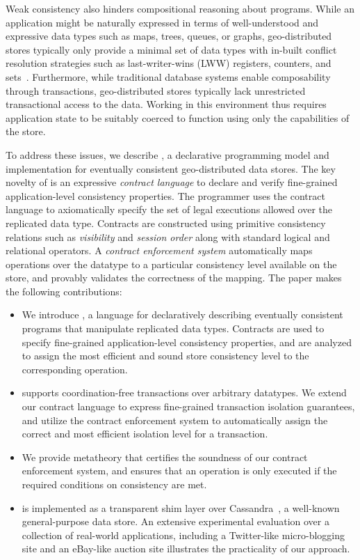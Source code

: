 Weak consistency also hinders compositional reasoning about programs.  While
an application might be naturally expressed in terms of well-understood and
expressive data types such as maps, trees, queues, or graphs,
geo-distributed stores typically only provide a minimal set of data types
with in-built conflict resolution strategies such as last-writer-wins (LWW)
registers, counters, and sets~\cite{Cassandra,DynamoDB}.  Furthermore, while
traditional database systems enable composability through transactions,
geo-distributed stores typically lack unrestricted transactional access to
the data.  Working in this environment thus requires application state to be
suitably coerced to function using only the capabilities of the store.

To address these issues, we describe \name, a declarative programming model
and implementation for eventually consistent geo-distributed data
stores. The key novelty of \name is an expressive \emph{contract language}
to declare and verify fine-grained application-level consistency
properties. The programmer uses the contract language to axiomatically
specify the set of legal executions allowed over the replicated data
type. Contracts are constructed using primitive consistency relations such
as \emph{visibility} and \emph{session order} along with standard logical
and relational operators. A \emph{contract enforcement system} automatically
maps operations over the datatype to a particular consistency level
available on the store, and provably validates the correctness of the
mapping.  The paper makes the following contributions:

\begin{itemize}
\setlength{\itemsep}{2pt}
\item We introduce \name, a language for declaratively describing eventually
	consistent programs that manipulate replicated data types. Contracts are used
	to specify fine-grained application-level consistency properties, and are
	analyzed to assign the most efficient and sound store consistency level to
	the corresponding operation.
\item \name supports coordination-free transactions over arbitrary datatypes.
	We extend our contract language to express fine-grained transaction isolation
	guarantees, and utilize the contract enforcement system to automatically
	assign the correct and most efficient isolation level for a transaction.
\item We provide metatheory that certifies the soundness of our contract enforcement
	system, and ensures that an operation is only executed if the required
	conditions on consistency are met.
\item \name is implemented as a transparent shim layer over
  Cassandra~\cite{Cassandra}, a well-known general-purpose data store.  An
  extensive experimental evaluation over a collection of real-world
  applications, including a Twitter-like micro-blogging site and an
  eBay-like auction site illustrates the practicality of our approach.
\end{itemize}

